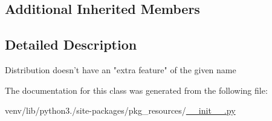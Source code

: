\subsection*{Additional Inherited Members}


\subsection{Detailed Description}
\begin{DoxyVerb}Distribution doesn't have an "extra feature" of the given name\end{DoxyVerb}
 

The documentation for this class was generated from the following file\+:\begin{DoxyCompactItemize}
\item 
venv/lib/python3./site-\/packages/pkg\+\_\+resources/\hyperlink{venv_2lib_2python3_89_2site-packages_2pkg__resources_2____init_____8py}{\+\_\+\+\_\+init\+\_\+\+\_\+.\+py}\end{DoxyCompactItemize}
